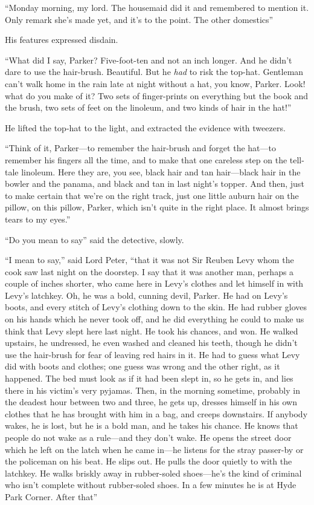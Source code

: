 \enquote{Monday morning, my lord. The housemaid did it and remembered to mention it. Only remark she’s made yet, and it’s to the point. The other domestics\longdash}

His features expressed disdain.

\enquote{What did I say, Parker? Five-foot-ten and not an inch longer. And he didn’t dare to use the hair-brush. Beautiful. But he \textit{had} to risk the top-hat. Gentleman can’t walk home in the rain late at night without a hat, you know, Parker. Look! what do you make of it? Two sets of finger-prints on everything but the book and the brush, two sets of feet on the linoleum, and two kinds of hair in the hat!}

He lifted the top-hat to the light, and extracted the evidence with tweezers.

\enquote{Think of it, Parker\allowbreak---\allowbreak to remember the hair-brush and forget the hat\allowbreak---\allowbreak to remember his fingers all the time, and to make that one careless step on the tell-tale linoleum. Here they are, you see, black hair and tan hair\allowbreak---\allowbreak black hair in the bowler and the panama, and black and tan in last night’s topper. And then, just to make certain that we’re on the right track, just one little auburn hair on the pillow, on this pillow, Parker, which isn’t quite in the right place. It almost brings tears to my eyes.}

\enquote{Do you mean to say\longdash} said the detective, slowly.

\enquote{I mean to say,} said Lord Peter, \enquote{that it was not Sir Reuben Levy whom the cook saw last night on the doorstep. I say that it was another man, perhaps a couple of inches shorter, who came here in Levy’s clothes and let himself in with Levy’s latchkey. Oh, he was a bold, cunning devil, Parker. He had on Levy’s boots, and every stitch of Levy’s clothing down to the skin. He had rubber gloves on his hands which he never took off, and he did everything he could to make us think that Levy slept here last night. He took his chances, and won. He walked upstairs, he undressed, he even washed and cleaned his teeth, though he didn’t use the hair-brush for fear of leaving red hairs in it. He had to guess what Levy did with boots and clothes; one guess was wrong and the other right, as it happened. The bed must look as if it had been slept in, so he gets in, and lies there in his victim’s very pyjamas. Then, in the morning sometime, probably in the deadest hour between two and three, he gets up, dresses himself in his own clothes that he has brought with him in a bag, and creeps downstairs. If anybody wakes, he is lost, but he is a bold man, and he takes his chance. He knows that people do not wake as a rule\allowbreak---\allowbreak and they don’t wake. He opens the street door which he left on the latch when he came in\allowbreak---\allowbreak he listens for the stray passer-by or the policeman on his beat. He slips out. He pulls the door quietly to with the latchkey. He walks briskly away in rubber-soled shoes\allowbreak---\allowbreak he’s the kind of criminal who isn’t complete without rubber-soled shoes. In a few minutes he is at Hyde Park Corner. After that\longdash}

